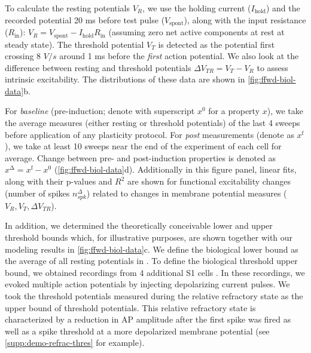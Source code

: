 To calculate the resting potentials $V_R$, we use
        the holding current ($I_{\mathrm{hold}}$)
        and the recorded potential 20 ms before test pulse ($V_{\mathrm{spont}}$),
        along with the input resistance ($R_{\mathrm{in}}$):
            $V_R = V_{\mathrm{spont}} - I_{\mathrm{hold}} R_{\mathrm{in}}$
            (assuming zero net active components at rest at steady state).
    The threshold potential $V_T$ is detected
        as the potential first crossing 8 $V/s$
        \citep[for a similar approach, see][]{Mahon2012-bt, Popescu2021-cj}
        around 1 ms before the \textit{first} action potential.
    We also look at the difference between resting and threshold potentials
        $\Delta V_{TR} = V_T - V_R$ to assess intrinsic excitability.
    The distributions of these data are shown in \autoref{fig:ffwd-biol-data}b.

For \textit{baseline} (pre-induction; denote with superscript $x^{\mathrm{0}}$ for a property $x$),
        we take the average measures (either resting or threshold potentials)
        of the last 4 sweeps before application of any plasticity protocol.
    For \textit{post} measurements (denote as $x^{\mathrm{f}}$),
        we take at least 10 sweeps near the end of the experiment of each cell for average.
    Change between pre- and post-induction properties is denoted as
        $x^{\mathrm{\Delta}} = x^{\mathrm{f}} - x^{\mathrm{0}}$
        (\autoref{fig:ffwd-biol-data}d).
    Additionally in this figure panel, linear fits, along with their p-values and $R^2$
        are shown for functional excitability changes
        (number of spikes $n_{spk}^{\Delta}$)
        related to changes in membrane potential measures ($V_R, V_T, \Delta V_{TR}$).

In addition, we determined the theoretically conceivable lower and upper threshold bounds
        which, for illustrative purposes, are shown together
        with our modeling results in \autoref{fig:ffwd-biol-data}c.
    We define the biological lower bound
        as the average of all resting potentials in \cite{Gill2020-wy}.
    To define the biological threshold upper bound,
        we obtained recordings from 4 additional S1 cells
        \citep[same recording conditions as in][]{Gill2020-wy}.
    In these recordings, we evoked multiple action potentials
        by injecting depolarizing current pulses.
    We took the threshold potentials measured
        during the relative refractory state
        as the upper bound of threshold potentials.
    This relative refractory state is characterized
        by a reduction in AP amplitude after the first spike was fired
        as well as a spike threshold at a more depolarized membrane potential
        (see \autoref{supp:demo-refrac-thres} for example).
